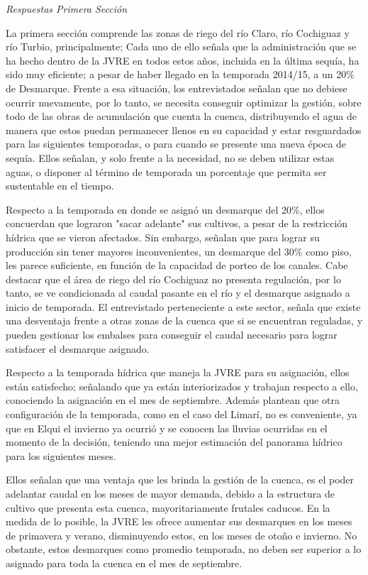 \documentclass[11pt,]{article}
\begin{document}
\textit {Respuestas Primera Sección}\bigskip

La primera sección comprende las zonas de riego del río Claro, río Cochiguaz y río Turbio, principalmente; Cada uno de ello señala que la administración que se ha hecho dentro de la JVRE en todos estos años, incluida en la última sequía, ha sido muy eficiente; a pesar de haber llegado en la temporada 2014/15, a un 20\% de Desmarque. Frente a esa situación, los entrevistados señalan que no debiese ocurrir nuevamente, por lo tanto, se necesita conseguir optimizar la gestión, sobre todo de las obras de acumulación que cuenta la cuenca, distribuyendo el agua de manera que estos puedan permanecer llenos en su capacidad y estar resguardados para las siguientes temporadas, o para cuando se presente una nueva época de sequía. Ellos señalan, y solo frente a la necesidad, no se deben utilizar estas aguas, o disponer al término de temporada un porcentaje que permita ser sustentable en el tiempo.\bigskip

Respecto a la temporada en donde se asignó un desmarque del 20\%, ellos concuerdan que lograron "sacar adelante" sus cultivos, a pesar de la restricción hídrica que se vieron afectados. Sin embargo, señalan que para lograr su producción sin tener mayores inconvenientes, un desmarque del 30\% como piso, les parece suficiente, en función de la capacidad de porteo de los canales. Cabe destacar que el área de riego del río Cochiguaz no presenta regulación, por lo tanto, se ve condicionada al caudal pasante en el río y el desmarque asignado a inicio de temporada. El entrevistado perteneciente a este sector, señala que existe una desventaja frente a otras zonas de la cuenca que si se encuentran reguladas, y pueden gestionar los embalses para conseguir el caudal necesario para lograr satisfacer el desmarque asignado. \bigskip
 
Respecto a la temporada hídrica que maneja la JVRE para su asignación, ellos están satisfecho; señalando que ya están interiorizados y trabajan respecto a ello, conociendo la asignación en el mes de septiembre. Además plantean que otra configuración de la temporada, como en el caso del Limarí, no es conveniente, ya que en Elqui el invierno ya ocurrió y se conocen las lluvias ocurridas en el momento de la decisión, teniendo una mejor estimación del panorama hídrico para los siguientes meses.  \bigskip

Ellos señalan que una ventaja que les brinda la gestión de la cuenca, es el poder adelantar caudal en los meses de mayor demanda, debido a la estructura de cultivo que presenta esta cuenca, mayoritariamente frutales caducos. En la medida de lo posible, la JVRE les ofrece aumentar sus desmarques en los meses de primavera y verano, disminuyendo estos, en los meses de otoño e invierno. No obstante, estos desmarques como promedio temporada, no deben ser superior a lo asignado para toda la cuenca en el mes de septiembre.  \bigskip
\end{document}
